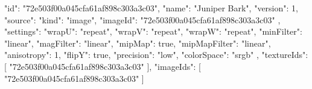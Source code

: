 {
  "id": "72e503f00a045cfa61af898c303a3c03",
  "name": "Juniper Bark",
  "version": 1,
  "source": {
    "kind": "image",
    "imageId": "72e503f00a045cfa61af898c303a3c03"
  },
  "settings": {
    "wrapU": "repeat",
    "wrapV": "repeat",
    "wrapW": "repeat",
    "minFilter": "linear",
    "magFilter": "linear",
    "mipMap": true,
    "mipMapFilter": "linear",
    "anisotropy": 1,
    "flipY": true,
    "precision": "low",
    "colorSpace": "srgb"
  },
  "textureIds": [
    "72e503f00a045cfa61af898c303a3c03"
  ],
  "imageIds": [
    "72e503f00a045cfa61af898c303a3c03"
  ]
}
